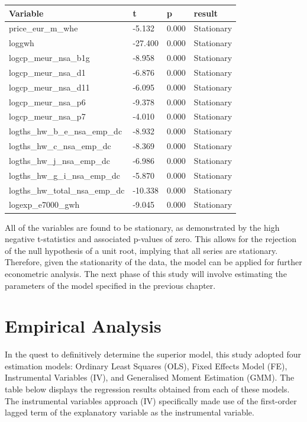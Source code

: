 \documentclass[12pt]{article}
\begin{document}
\begin{tabular}{ p{6.2cm} p{2cm} p{2cm} p{2cm} }

  \hline
Variable&t&p&result\\
 \hline
 price\_eur\_m\_whe&-5.132&0.000&Stationary\\
 loggwh&-27.400&0.000&Stationary\\
logcp\_meur\_nsa\_b1g&-8.958&0.000&Stationary\\
logcp\_meur\_nsa\_d1&-6.876&0.000&Stationary\\
logcp\_meur\_nsa\_d11&-6.095&0.000&Stationary\\
logcp\_meur\_nsa\_p6&-9.378&0.000&Stationary\\
logcp\_meur\_nsa\_p7&-4.010&0.000&Stationary\\
logths\_hw\_b\_e\_nsa\_emp\_dc&-8.932&0.000&Stationary\\
logths\_hw\_c\_nsa\_emp\_dc&-8.369&0.000&Stationary\\
logths\_hw\_j\_nsa\_emp\_dc&-6.986&0.000&Stationary\\
logths\_hw\_g\_i\_nsa\_emp\_dc&-5.870&0.000&Stationary\\
logths\_hw\_total\_nsa\_emp\_dc&-10.338&0.000&Stationary\\
logexp\_e7000\_gwh&-9.045&0.000&Stationary\\
 \hline
\end{tabular}

All of the variables are found to be stationary, as demonstrated by the high negative t-statistics and associated p-values of zero. This allows for the rejection of the null hypothesis of a unit root, implying that all series are stationary.
Therefore, given the stationarity of the data, the model can be applied for further econometric analysis. The next phase of this study will involve estimating the parameters of the model specified in the previous chapter.

\section{Empirical Analysis}

In the quest to definitively determine the superior model, this study adopted four estimation models: Ordinary Least Squares (OLS), Fixed Effects Model (FE), Instrumental Variables (IV), and Generalised Moment Estimation (GMM). The table below displays the regression results obtained from each of these models. The instrumental variables approach (IV) specifically made use of the first-order lagged term of the explanatory variable as the instrumental variable.
\end{document}

